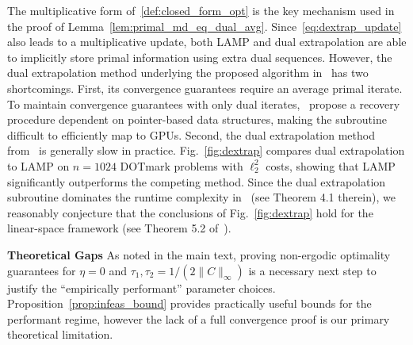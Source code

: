 \documentclass[10pt]{article}
\renewcommand{\O}{\mathcal{O}}
\newcommand{\tO}{\widetilde{\O}}
\theoremstyle{plain}
\theoremstyle{definition}
\theoremstyle{remark}
\begin{document}
The multiplicative form of~\eqref{def:closed_form_opt} is the key mechanism used in the proof of Lemma~\ref{lem:primal_md_eq_dual_avg}. Since~\eqref{eq:dextrap_update} also leads to a multiplicative update, both LAMP and dual extrapolation are able to implicitly store primal information using extra dual sequences. However, the dual extrapolation method underlying the proposed algorithm in~\cite{assadiSemiStreamingBipartiteMatching2022} has two shortcomings. First, its convergence guarantees require an average primal iterate. To maintain convergence guarantees with only dual iterates,~\cite{assadiSemiStreamingBipartiteMatching2022} propose a recovery procedure dependent on pointer-based data structures, making the subroutine difficult to efficiently map to GPUs. Second, the dual extrapolation method from~\cite{jambulapatiDirectTildelbraceOrbrace2019a} is generally slow in practice. Fig.~\ref{fig:dextrap} compares dual extrapolation to LAMP on $n=1024$ DOTmark problems with $\ell_2^2$ costs, showing that LAMP significantly outperforms the competing method. Since the dual extrapolation subroutine dominates the runtime complexity in~\cite{assadiSemiStreamingBipartiteMatching2022} (see Theorem 4.1 therein), we reasonably conjecture that the conclusions of Fig.~\ref{fig:dextrap} hold for the linear-space framework (see Theorem 5.2 of~\cite{assadiSemiStreamingBipartiteMatching2022}). 



\textbf{Theoretical Gaps} As noted in the main text, proving non-ergodic optimality guarantees for $\eta =0$ and $\tau_1,\tau_2=1/(2\|C\|_\infty)$ is a necessary next step to justify the ``empirically performant'' parameter choices. Proposition~\ref{prop:infeas_bound} provides practically useful bounds for the performant regime, however the lack of a full convergence proof is our primary theoretical limitation. %
\end{document}
